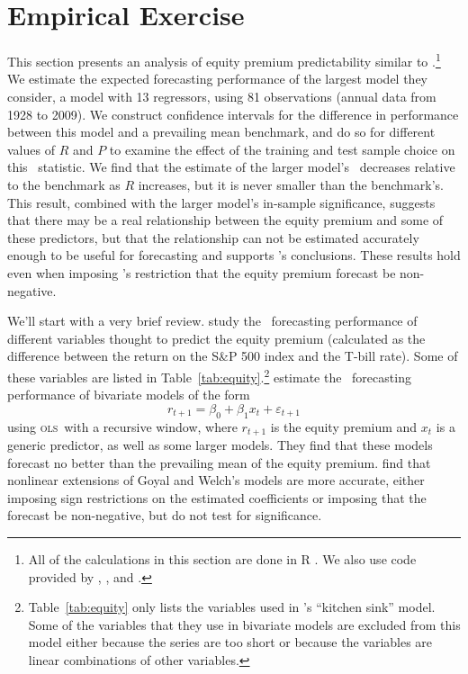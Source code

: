 \documentclass[11pt]{article}
\newcommand{\citepos}[1]{\citeauthor{#1}'s \citeyearpar{#1}}
\newcommand{\ols}{\textsc{ols}}
\begin{document}
\section{Empirical Exercise}\label{sec:empirics}
This section presents an analysis of equity premium predictability
similar to \citet{GoW:08}.\footnote{All of the calculations in this
  section are done in R \citep{Rde:10}.  We also use code provided by
  \citet{Zeh:02}, \citet{Zei:04}, and \citet{Har:10}.}  We estimate
the expected forecasting performance of the largest model they
consider, a model with 13 regressors, using 81 observations (annual
data from 1928 to 2009).  We construct confidence intervals for the
difference in performance between this model and a prevailing mean
benchmark, and do so for different values of $R$ and $P$ to examine
the effect of the training and test sample choice on this \oos\
statistic.  We find that the estimate of the larger model's \mse\
decreases relative to the benchmark as $R$ increases, but it is never
smaller than the benchmark's.  This result, combined with the larger
model's in-sample significance, suggests that there may be a real
relationship between the equity premium and some of these predictors,
but that the relationship can not be estimated accurately enough to be
useful for forecasting and supports \citepos{GoW:08}
conclusions.  These results hold even when imposing
\citepos{CaT:08} restriction that the equity
premium forecast be non-negative.

We'll start with a very brief review.  \citet{GoW:08}
study the \oos\ forecasting performance of different variables thought
to predict the equity premium (calculated as the difference between
the return on the S\&P 500 index and the T-bill rate).  Some of these
variables are listed in
Table~\ref{tab:equity}.\footnote{Table~\ref{tab:equity} only lists the
  variables used in \citepos{GoW:08} ``kitchen sink''
  model.  Some of the variables that they use in bivariate models are
  excluded from this model either because the series are too short or
  because the variables are linear combinations of other variables.}
\citet{GoW:08} estimate the \oos\ forecasting
performance of bivariate models of the form
\[
r_{t+1} = \beta_0 + \beta_1 x_t + \varepsilon_{t+1}
\]
using \ols\ with a recursive window, where $r_{t+1}$ is the equity
premium and $x_t$ is a generic predictor, as well as some larger
models.  They find that these models forecast no better than the
prevailing mean of the equity premium.
\citet{CaT:08} find that nonlinear extensions of
Goyal and Welch's models are more accurate, either imposing sign
restrictions on the estimated coefficients or imposing that the
forecast be non-negative, but do not test for significance.
\end{document}
